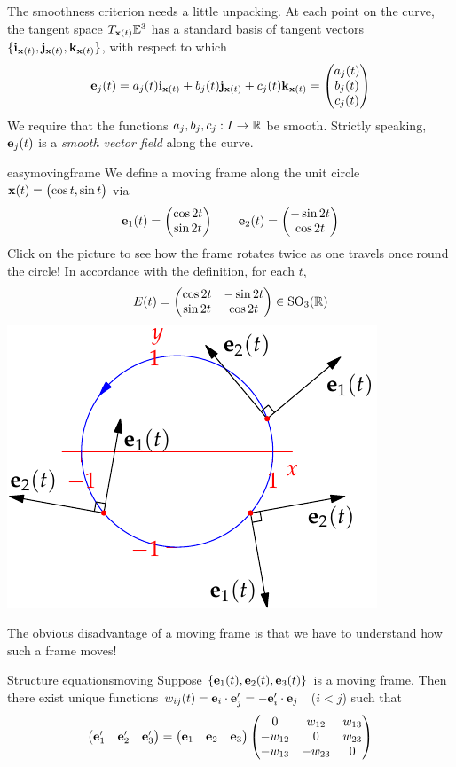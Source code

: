 The smoothness criterion needs a little unpacking. At each point on the curve, the tangent space $T_{{\mathbf{x}}(t)}\mathbb{E}^3$ has a standard basis of tangent vectors $\{{\mathbf{i}}_{{\mathbf{x}}(t)},{\mathbf{j}}_{{\mathbf{x}}(t)},{\mathbf{k}}_{{\mathbf{x}}(t)}\}$, with respect to which
\[
	{\mathbf{e}}_j(t) =a_j(t){\mathbf{i}}_{{\mathbf{x}}(t)}+b_j(t){\mathbf{j}}_{{\mathbf{x}}(t)}+c_j(t){\mathbf{k}}_{{\mathbf{x}}(t)} =\begin{pmatrix}a_j(t)\\b_j(t)\\c_j(t)\end{pmatrix}
\]
We require that the functions $a_j,b_j,c_j:I\to \mathbb{R}$ be smooth. Strictly speaking, ${\mathbf{e}}_j(t)$ is a \emph{smooth vector field} along the curve.


\begin{example}[lower separated=false, sidebyside, sidebyside align=top seam, sidebyside gap=0pt, righthand width=0.4\linewidth]{}{easymovingframe}
	We define a moving frame along the unit circle ${\mathbf{x}}(t)=\bigl(\cos t,\sin t\bigr)$ via
	\[
		{\mathbf{e}}_1(t) =\begin{pmatrix}\cos 2t\\\sin 2t\end{pmatrix}\qquad {\mathbf{e}}_2(t) =\begin{pmatrix}-\sin 2t\\\cos 2t\end{pmatrix}
	\]
	Click on the picture to see how the frame rotates twice as one travels once round the circle!\smallbreak
	In accordance with the definition, for each $t$,
	\[
		E(t)=
		\begin{pmatrix}
			\cos 2t&-\sin 2t\\
			\sin 2t&\cos 2t
		\end{pmatrix}
		\in\mathrm{SO}_3(\mathbb{R})
	\]
	\tcblower
	\flushright\href{http://math.uci.edu/~ndonalds/math162a/vector-anim.html}{\includegraphics[scale=0.9]{vector-anim2}}
\end{example}

\goodbreak


The obvious disadvantage of a moving frame is that we have to understand how such a frame moves!

\begin{thm}{Structure equations}{moving}
	Suppose $\{{\mathbf{e}}_1(t),{\mathbf{e}}_2(t),{\mathbf{e}}_3(t)\}$ is a moving frame. Then there exist unique functions $w_{ij}(t)={\mathbf{e}}_i\cdot{\mathbf{e}}_j' =-{\mathbf{e}}'_i\cdot{\mathbf{e}}_j$ \ ($i<j$) such that
	\[
		\begin{pmatrix}
  		{\mathbf{e}}_1'&{\mathbf{e}}_2'&{\mathbf{e}}_3'
  	\end{pmatrix}=
		\begin{pmatrix}
			{\mathbf{e}}_1&{\mathbf{e}}_2&{\mathbf{e}}_3
		\end{pmatrix}
		\begin{pmatrix}
			0&w_{12}&w_{13}\\
			-w_{12}&0&w_{23}\\
			-w_{13}&-w_{23}&0
		\end{pmatrix}
	\]
\end{thm}

